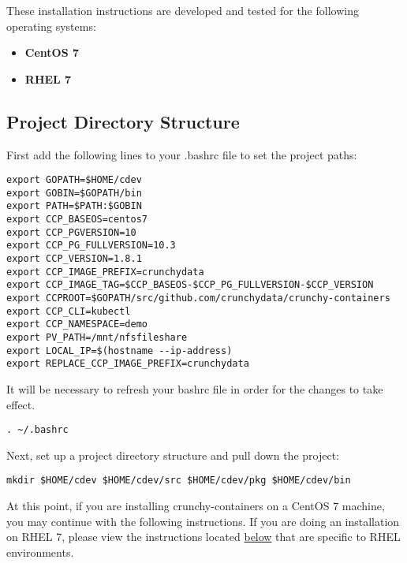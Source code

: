 \documentclass[letterpaper,12pt]{article}
\begin{document}
These installation instructions are developed and tested for the following operating systems:

\begin{itemize}
    \item \textbf{CentOS 7} 
    \item \textbf{RHEL 7} 
\end{itemize}
\subsection{Project Directory Structure}\label{/_project_setup/_project_directory_structure}

First add the following lines to your .bashrc file to set the project paths:
\vspace{.75em}
\begin{lstlisting}
export GOPATH=$HOME/cdev
export GOBIN=$GOPATH/bin
export PATH=$PATH:$GOBIN
export CCP_BASEOS=centos7
export CCP_PGVERSION=10
export CCP_PG_FULLVERSION=10.3
export CCP_VERSION=1.8.1
export CCP_IMAGE_PREFIX=crunchydata
export CCP_IMAGE_TAG=$CCP_BASEOS-$CCP_PG_FULLVERSION-$CCP_VERSION
export CCPROOT=$GOPATH/src/github.com/crunchydata/crunchy-containers
export CCP_CLI=kubectl
export CCP_NAMESPACE=demo
export PV_PATH=/mnt/nfsfileshare
export LOCAL_IP=$(hostname --ip-address)
export REPLACE_CCP_IMAGE_PREFIX=crunchydata
\end{lstlisting}

It will be necessary to refresh your bashrc file in order for the changes to take effect.
\vspace{.75em}
\begin{lstlisting}
. ~/.bashrc
\end{lstlisting}

Next, set up a project directory structure and pull down the project:
\vspace{.75em}
\begin{lstlisting}
mkdir $HOME/cdev $HOME/cdev/src $HOME/cdev/pkg $HOME/cdev/bin
\end{lstlisting}

At this point, if you are installing crunchy-containers on a CentOS 7 machine, you may continue with the following instructions. If you are doing an installation on RHEL 7, please view the instructions located \href{https://github.com/crunchydata/crunchy-containers/blob/master/docs/install.adoc\#rhel-7}{below} that are specific to RHEL environments.
\end{document}

